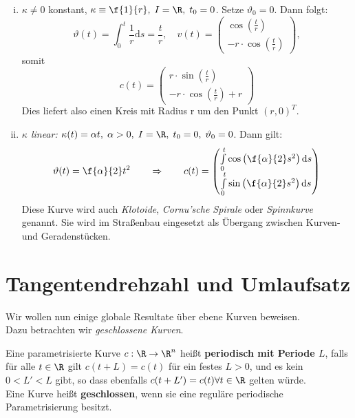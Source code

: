 \documentclass{mycourse}
\begin{document}
\begin{ex}
\begin{enumerate}[i)]
	\item
	 $\kappa \neq 0$ konstant, $\kappa \equiv \f{1}{r}, \; I = \R, \; t_0 = 0$. Setze $\vartheta_0 = 0$. Dann folgt:
	 \[
	 \vartheta(t)=\int_0^t \frac{1}{r} \mathrm d s= \frac{t}{r}, \quad v(t)=\begin{pmatrix} \cos\left (\frac{t}{r}\right ) \\ -r \cdot \cos\left ( \frac t r \right ) \end{pmatrix},
	 \]
	 somit 
	 \[
	 c(t)=\begin{pmatrix} r \cdot \sin\left ( \frac t r \right ) \\ -r \cdot \cos \left ( \frac t r \right ) +r \end{pmatrix}
	 \]
	 Dies liefert also einen Kreis mit Radius r um den Punkt $(r,0)^T$.
	 
	 \item \emph{ $\kappa$ linear:} $\kappa (t) = \alpha t, \; \alpha > 0, \; I = \R, \; t_0 = 0, \; \vartheta_0 = 0$. Dann gilt: 
	 \[ \vartheta(t) = \f{\alpha}{2} t^2 \qquad \Rightarrow \qquad c(t) = \begin{pmatrix} \int\limits_0^t \cos \left (\f{\alpha}{2} s^2 \right ) \mathrm d s \\ \int\limits_0^t \sin \left (\f{\alpha}{2} s^2 \right ) \mathrm d s \end{pmatrix}
	 \]
	 Diese Kurve wird auch \emph{Klotoide}, \emph{Cornu'sche Spirale} oder \emph{Spinnkurve} genannt. Sie wird im Straßenbau eingesetzt als Übergang zwischen Kurven- und Geradenstücken.  
\end{enumerate}
\end{ex}

\section{Tangentendrehzahl und Umlaufsatz}
Wir wollen nun einige globale Resultate über ebene Kurven beweisen. \\
Dazu betrachten wir \emph{geschlossene Kurven}. \\
\fixme[Bilder]

\begin{df}
Eine parametrisierte Kurve $c: \R \to \R^n$ heißt \textbf{periodisch mit Periode $L$}, falls für alle $t \in \R$ gilt $c(t+L) = c(t)$ für ein festes $L > 0$, und es kein $ 0 < L' < L$ gibt, so dass ebenfalls $c(t+L') = c(t) \forall t \in \R$ gelten würde. \\
Eine Kurve heißt \textbf{geschlossen}, wenn sie eine reguläre periodische Parametrisierung besitzt.
\end{df}
\end{document}
